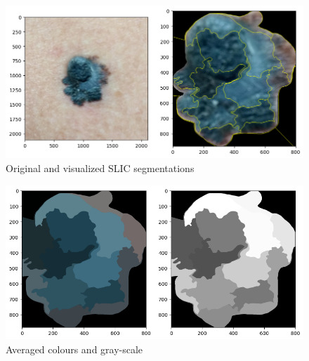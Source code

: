 \begin{figure}[H]
    \centering
    \includegraphics[width=1\linewidth]{Original_Segmentation.png}
    \caption{Original and visualized SLIC segmentations}
    \label{fig:enter-label}
\end{figure}
\begin{figure}[H]
    \centering
    \includegraphics[width=1\linewidth]{Averagecolor_GrayScale.png}
    \caption{Averaged colours and gray-scale}
    \label{fig:enter-label}
\end{figure}

